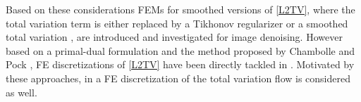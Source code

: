 \documentclass[enabledeprecatedfontcommands,cleardoublepage=empty,headsepline,twoside,11pt,DIV=15,BCOR=12mm,final]{scrartcl}
\begin{document}
Based on these considerations FEMs for smoothed versions of \eqref{L2TV}, where the total variation term is either replaced by a Tikhonov regularizer \cite{Lamichhane:09} or a smoothed total variation \cite{DeJaSe:12, Yao:08}, are introduced and investigated for image denoising. However based on a primal-dual formulation and the method proposed by Chambolle and Pock \cite{ChambollePock:11}, FE discretizations of \eqref{L2TV} have been directly tackled in \cite{Bartels:12, Bartels:15b, TianYuan:18}. Motivated by these approaches, in \cite{BaNoSa:14} a FE discretization of the total variation flow is considered as well. 
\end{document}
